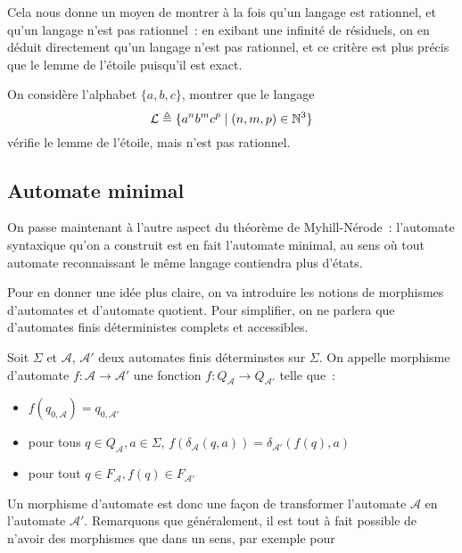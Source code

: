 Cela nous donne un moyen de montrer à la fois qu'un langage est rationnel, et
qu'un langage n'est pas rationnel~: en exibant une infinité de résiduels, on en
déduit directement qu'un langage n'est pas rationnel, et ce critère est plus
précis que le lemme de l'étoile puisqu'il est exact.

\begin{exercise}
  On considère l'alphabet $\{a,b,c\}$, montrer que le langage
  \[\mathcal L \triangleq \{a^nb^mc^p\mid (n,m,p)\in \mathbb N^3\}\]
  vérifie le lemme de l'étoile, mais n'est pas rationnel.
\end{exercise}

\subsection{Automate minimal}

On passe maintenant à l'autre aspect du théorème de Myhill-Nérode~: l'automate
syntaxique qu'on a construit est en fait l'automate minimal, au sens où tout
automate reconnaissant le même langage contiendra plus d'états.

Pour en donner une idée plus claire, on va introduire les notions de morphismes
d'automates et d'automate quotient. Pour simplifier, on ne parlera que
d'automates finis déterministes complets et accessibles.

\begin{definition}
  Soit $\Sigma$ et $\mathcal A$, $\mathcal A'$ deux automates finis déterminstes
  sur $\Sigma$. On appelle morphisme d'automate $f : \mathcal A \to \mathcal A'$
  une fonction $f : Q_{\mathcal A} \to Q_{\mathcal A'}$ telle que~:
  \begin{itemize}
  \item $f(q_{0,\mathcal A}) = q_{0,\mathcal A'}$
  \item pour tous $q \in Q_{\mathcal A}, a \in \Sigma$,
    $f(\delta_\mathcal A(q,a)) = \delta_{\mathcal A'}(f(q),a)$
  \item pour tout $q \in F_\mathcal A, f(q) \in F_{\mathcal A'}$
  \end{itemize}
\end{definition}

Un morphisme d'automate est donc une façon de transformer l'automate
$\mathcal A$ en l'automate $\mathcal A'$. Remarquons que généralement, il est
tout à fait possible de n'avoir des morphismes que dans un sens, par exemple
pour

